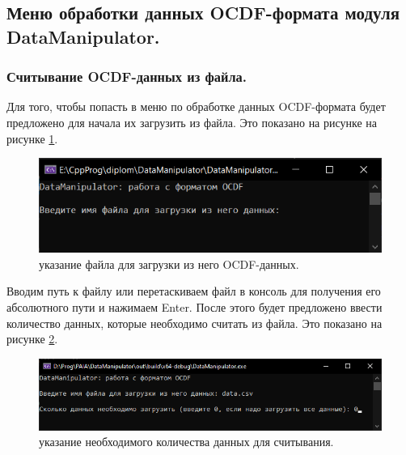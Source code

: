 \subsection{ \standartTitleFont
  Меню обработки данных OCDF-формата модуля DataManipulator.
} 

\subsubsection{ \standartTitleFont
  Считывание OCDF-данных из файла.
} 

{\standartFont

  \par Для того, чтобы попасть в меню по обработке данных OCDF-формата будет предложено для начала их загрузить из файла. Это показано на рисунке на рисунке \ref{fig:readOCDFst1}.

  \begin{figure}[H]
    \centering
    \includegraphics[width=\textwidth]{images/forDataManipulator/readOCDFstage1.png}
    \caption{указание файла для загрузки из него OCDF-данных.}
    \label{fig:readOCDFst1}
  \end{figure}

  \par Вводим путь к файлу или перетаскиваем файл в консоль для получения его абсолютного пути и нажимаем Enter. После этого будет предложено ввести количество данных, которые необходимо считать из файла. Это показано на рисунке \ref{fig:readOCDFst2}.

  \begin{figure}[H]
    \centering
    \includegraphics[width=\textwidth]{images/forDataManipulator/readOCDFstage2.png}
    \caption{указание необходимого количества данных для считывания.}
    \label{fig:readOCDFst2}
  \end{figure}

}
